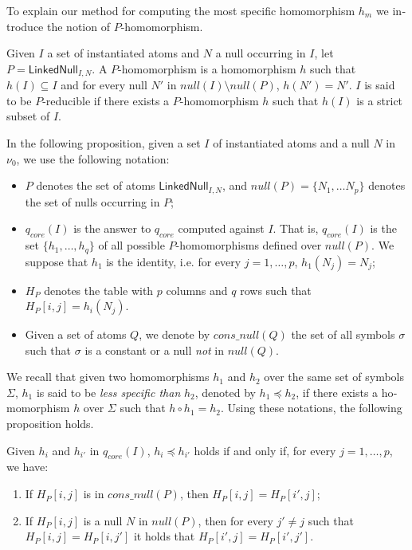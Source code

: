 \begin{otherlanguage}{english}
To explain our method for computing the most specific homomorphism $h_m$ we introduce the notion of $P$-homomorphism.

\begin{definition}
    Given $I$ a set of instantiated atoms and $N$ a null occurring in $I$, let $P=\textsf{LinkedNull}_{I,N}$.
    A $P$-homomorphism is a homomorphism $h$ such that $h(I) \subseteq I$ and for every null $N'$ in $null(I) \setminus null(P)$, $h(N')=N'$.
    $I$ is said to be $P$-reducible if there exists a $P$-homomorphism $h$ such that $h(I)$ is a strict subset of $I$.
\end{definition}

In the following proposition, given a set $I$ of instantiated atoms and a null $N$ in $\nu_0$, we use the following notation:
\begin{itemize}
    \item $P$ denotes the set of atoms $\textsf{LinkedNull}_{I,N}$, and $null(P)=\{N_1, \ldots N_p\}$ denotes the set of nulls occurring in $P$;

    \item $q_{core}(I)$ is the answer to $q_{core}$ computed against $I$.
          That is, $q_{core}(I)$ is the set $\{h_1, \ldots, h_q\}$ of all possible $P$-homomor\-phisms defined over $null(P)$.
          We suppose that $h_1$ is the identity, i.e. for every $j=1,\ldots,p$, $h_1(N_j)=N_j$;

    \item $H_P$ denotes the table with $p$ columns and $q$ rows such that $H_P[i,j] = h_i(N_j)$.

    \item Given a set of atoms $Q$, we denote by $cons\_null(Q)$ the set of all symbols $\sigma$ such that $\sigma$ is a constant or a null \emph{not} in $null(Q)$.
\end{itemize}

We recall that given two homomorphisms $h_1$ and $h_2$ over the same set of symbols $\Sigma$, $h_1$ is said to be \emph{less specific than} $h_2$, denoted by $h_1 \preceq h_2$, if there exists a homomorphism $h$ over $\Sigma$ such that $h \circ h_{1}=h_2$.
Using these notations, the following proposition holds.

\begin{proposition}
    \label{prop:spec}
    Given $h_i$ and $h_{i'}$ in $q_{core}(I)$, $h_i \preceq h_{i'}$ holds if and only if, for every $j=1, \dots, p$, we have:
    \begin{enumerate}
        \item If $H_P[i,j]$ is in $cons\_null(P)$, then $H_P[i,j] = H_P[i',j]$;
        \item If $H_P[i,j]$ is a null $N$ in $null(P)$, then for every $j' \ne j$ such that $H_P[i,j] = H_P[i,j']$ it holds that $H_P[i',j] = H_P[i',j']$.
    \end{enumerate}
\end{proposition}


\end{otherlanguage}
